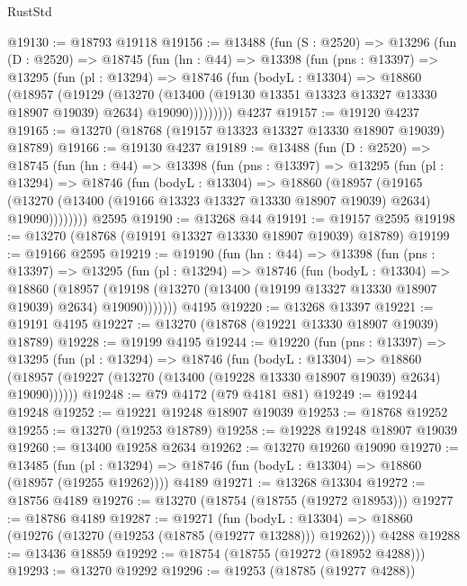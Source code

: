 \begin{lexlean}{RustStd}
\begin{coremodule}
@19130 := @18793 @19118
@19156 := @13488
    (fun (S : @2520) =>
    @13296
      (fun (D : @2520) =>
      @18745
        (fun (hn : @44) =>
        @13398
          (fun (pns : @13397) =>
          @13295
            (fun (pl : @13294) =>
            @18746
              (fun (bodyL : @13304) =>
              @18860
                (@18957
                  (@19129
                    (@13270
                      (@13400 (@19130 @13351 @13323 @13327 @13330 @18907 @19039) @2634)
                      @19090)))))))))
    @4237
@19157 := @19120 @4237
@19165 := @13270 (@18768 (@19157 @13323 @13327 @13330 @18907 @19039) @18789)
@19166 := @19130 @4237
@19189 := @13488
    (fun (D : @2520) =>
    @18745
      (fun (hn : @44) =>
      @13398
        (fun (pns : @13397) =>
        @13295
          (fun (pl : @13294) =>
          @18746
            (fun (bodyL : @13304) =>
            @18860
              (@18957
                (@19165
                  (@13270 (@13400 (@19166 @13323 @13327 @13330 @18907 @19039) @2634) @19090))))))))
    @2595
@19190 := @13268 @44
@19191 := @19157 @2595
@19198 := @13270 (@18768 (@19191 @13327 @13330 @18907 @19039) @18789)
@19199 := @19166 @2595
@19219 := @19190
    (fun (hn : @44) =>
    @13398
      (fun (pns : @13397) =>
      @13295
        (fun (pl : @13294) =>
        @18746
          (fun (bodyL : @13304) =>
          @18860
            (@18957
              (@19198 (@13270 (@13400 (@19199 @13327 @13330 @18907 @19039) @2634) @19090)))))))
    @4195
@19220 := @13268 @13397
@19221 := @19191 @4195
@19227 := @13270 (@18768 (@19221 @13330 @18907 @19039) @18789)
@19228 := @19199 @4195
@19244 := @19220
    (fun (pns : @13397) =>
    @13295
      (fun (pl : @13294) =>
      @18746
        (fun (bodyL : @13304) =>
        @18860 (@18957 (@19227 (@13270 (@13400 (@19228 @13330 @18907 @19039) @2634) @19090))))))
@19248 := @79 @4172 (@79 @4181 @81)
@19249 := @19244 @19248
@19252 := @19221 @19248 @18907 @19039
@19253 := @18768 @19252
@19255 := @13270 (@19253 @18789)
@19258 := @19228 @19248 @18907 @19039
@19260 := @13400 @19258 @2634
@19262 := @13270 @19260 @19090
@19270 := @13485
    (fun (pl : @13294) => @18746 (fun (bodyL : @13304) => @18860 (@18957 (@19255 @19262))))
    @4189
@19271 := @13268 @13304
@19272 := @18756 @4189
@19276 := @13270 (@18754 (@18755 (@19272 @18953)))
@19277 := @18786 @4189
@19287 := @19271
    (fun (bodyL : @13304) => @18860 (@19276 (@13270 (@19253 (@18785 (@19277 @13288))) @19262)))
    @4288
@19288 := @13436 @18859
@19292 := @18754 (@18755 (@19272 (@18952 @4288)))
@19293 := @13270 @19292
@19296 := @19253 (@18785 (@19277 @4288))

\end{coremodule}
\end{lexlean}
